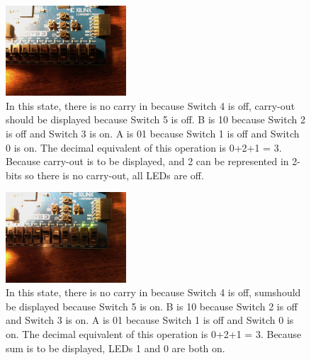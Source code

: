 \documentclass[11pt]{article}
\begin{document}
\begin{figure}[H]
\begin{center}
	\includegraphics[width=0.4\textwidth]{./report-images/Part2/IMG_0473.jpg}
	\caption{\label{fig:BitMuxOnePlusTwoPlusOneOverFlow}In this state, there is no carry in because Switch 4 is off, carry-out should be displayed because Switch 5 is off. B is 10 because Switch 2 is off and Switch 3 is on. A is 01 because Switch 1 is off and Switch 0 is on. The decimal equivalent of this operation is 0+2+1 = 3. Because carry-out is to be displayed, and 2 can be represented in 2-bits so there is no carry-out, all LEDs are off.}
\end{center}
\end{figure}

\begin{figure}[H]
\begin{center}
	\includegraphics[width=0.4\textwidth]{./report-images/Part2/IMG_0474.jpg}
	\caption{\label{fig:BitMuxZeroPlusTwoPlusOneSum}In this state, there is no carry in because Switch 4 is off, sumshould be displayed because Switch 5 is on. B is 10 because Switch 2 is off and Switch 3 is on. A is 01 because Switch 1 is off and Switch 0 is on. The decimal equivalent of this operation is 0+2+1 = 3. Because sum is to be displayed, LEDs 1 and 0 are both on.}
\end{center}
\end{figure}
\end{document}
